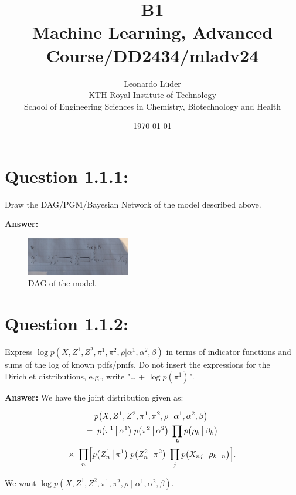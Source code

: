\documentclass{article}
\title{B1\\\Large{Machine Learning, Advanced Course/DD2434/mladv24}}
\author{Leonardo Lüder \\ KTH Royal Institute of Technology\\ School of Engineering Sciences in Chemistry, Biotechnology and Health}
\date{\today}
\begin{document}
\maketitle

\fancyfoot[C]{\thepage}
\begin{multicols}{2}

    \section*{Question 1.1.1:}
    Draw the DAG/PGM/Bayesian Network of the model described above.

    \textbf{Answer:}
    
    \begin{figure}[H]
        \centering
        \includegraphics[width=0.4\textwidth]{figures/1/DAG.jpg}
        \caption{DAG of the model.}
    \end{figure}

    \section*{Question 1.1.2:}

    Express \( \log p(X, Z^1, Z^2, \pi^1, \pi^2, \rho | \alpha^1, \alpha^2, \beta) \) in terms of indicator functions and sums of the log of known pdfs/pmfs.  
    Do not insert the expressions for the Dirichlet distributions, e.g., write "… + \(\log p(\pi^1)\)".

    \textbf{Answer:}
    We have the joint distribution given as:
    
    \begin{multline}
    p\bigl(X, Z^1, Z^2, \pi^1, \pi^2, \rho \,\big|\,
        \alpha^1, \alpha^2, \beta\bigr) \;\\=\;
    p\bigl(\pi^1 \,\big|\,\alpha^1\bigr)\;
    p\bigl(\pi^2 \,\big|\,\alpha^2\bigr)\;
    \prod_{k} p\bigl(\rho_k \,\big|\,\beta_k\bigr) \\
    \times\; \prod_{n} \Bigl[
    p\bigl(Z^1_n \,\big|\,\pi^1\bigr)\;
    p\bigl(Z^2_n \,\big|\,\pi^2\bigr)\;
    \prod_{j} p\bigl(X_{nj} \,\big|\,\rho_{k=n}\bigr)
    \Bigr].
    \end{multline}
    

    We want \(\log p(X,Z^1,Z^2,\pi^1,\pi^2,\rho \mid \alpha^1,\alpha^2,\beta)\).


\end{multicols}
\end{document}
